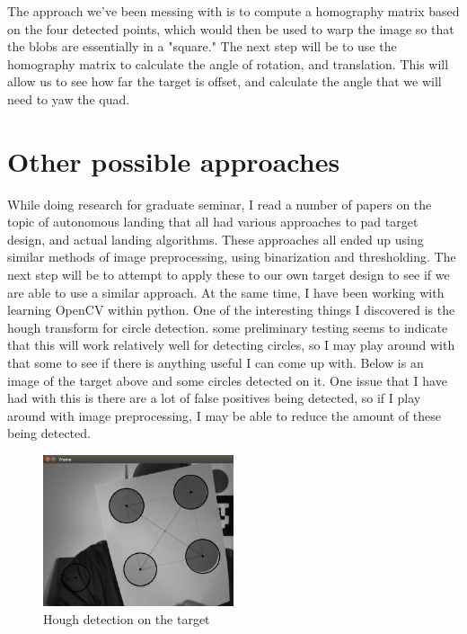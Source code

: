 \documentclass{article}
\begin{document}
	The approach we've been messing with is to compute a homography matrix based on the four detected points, which would then be used to warp the image so that the blobs are essentially in a "square." The next step will be to use the homography matrix to calculate the angle of rotation, and translation. This will allow us to see how far the target is offset, and calculate the angle that we will need to yaw the quad.
	
	\section{Other possible approaches}
	While doing research for graduate seminar, I read a number of papers on the topic of autonomous landing that all had various approaches to pad target design, and actual landing algorithms. These approaches all ended up using similar methods of image preprocessing, using binarization and thresholding. The next step will be to attempt to apply these to our own target design to see if we are able to use a similar approach.\hfill\hfill\linebreak\linebreak
	At the same time, I have been working with learning OpenCV within python. One of the interesting things I discovered is the hough transform for circle detection. some preliminary testing seems to indicate that this will work relatively well for detecting circles, so I may play around with that some to see if there is anything useful I can come up with. Below is an image of the target above and some circles detected on it. One issue that I have had with this is there are a lot of false positives being detected, so if I play around with image preprocessing, I may be able to reduce the amount of these being detected.
	
		\begin{figure}[h]
			\centering
			\includegraphics[width=0.5\textwidth]{circles.png}
			\caption{Hough detection on the target}
		\end{figure}
		
\end{document}
